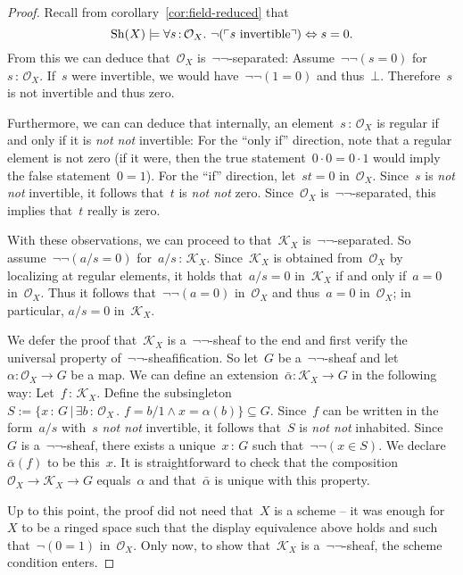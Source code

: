 \documentclass[10pt]{amsart}
\theoremstyle{definition}
\theoremstyle{plain}
\theoremstyle{remark}
\renewcommand{\O}{\mathcal{O}}
\newcommand{\K}{\mathcal{K}}
\newcommand{\Sh}{\mathrm{Sh}}
\newcommand{\?}{\,{:}\,}
\renewcommand{\_}{\mathpunct{.}\,}
\newcommand{\speak}[1]{\ulcorner\text{\textnormal{#1}}\urcorner}
\newcommand{\notnot}{\emph{not not}\xspace}
\begin{document}
\begin{proof}Recall from corollary~\ref{cor:field-reduced} that
\[ \Sh(X) \models \forall s\?\O_X\_ \neg(\speak{$s$ invertible}) \Leftrightarrow
s=0. \]
From this we can deduce that~$\O_X$ is~$\neg\neg$-separated:
Assume~$\neg\neg(s=0)$ for~$s\?\O_X$. If~$s$ were invertible, we would
have~$\neg\neg(1=0)$ and thus~$\bot$. Therefore~$s$ is not invertible and thus
zero.

Furthermore, we can can deduce that internally, an element~$s\?\O_X$ is regular
if and only if it is \notnot invertible: For the ``only if'' direction,
note that a regular element is not zero (if it were, then the true statement~$0
\cdot 0 = 0 \cdot 1$ would imply the false statement~$0 = 1$). For the ``if''
direction, let~$st = 0$ in~$\O_X$. Since~$s$ is \notnot invertible, it follows
that~$t$ is \notnot zero. Since~$\O_X$ is~$\neg\neg$-separated, this implies
that~$t$ really is zero.

With these observations, we can proceed to that~$\K_X$ is~$\neg\neg$-separated.
So assume~$\neg\neg(a/s = 0)$ for~$a/s \? \K_X$. Since~$\K_X$ is obtained
from~$\O_X$ by localizing at regular elements, it holds that~$a/s = 0$
in~$\K_X$ if and only if~$a = 0$ in~$\O_X$. Thus it follows that~$\neg\neg(a =
0)$ in~$\O_X$ and thus~$a = 0$ in~$\O_X$; in particular, $a/s = 0$ in~$\K_X$.

We defer the proof that~$\K_X$ is a~$\neg\neg$-sheaf to the end and first
verify the universal property of~$\neg\neg$-sheafification.
So let~$G$ be a~$\neg\neg$-sheaf and let~$\alpha : \O_X \to G$ be a map. We
can define an extension~$\bar\alpha : \K_X \to G$ in the following way:
Let~$f \? \K_X$. Define the subsingleton~$S := \{ x \? G \,|\, \exists
b\?\O_X\_ f = b/1 \wedge x = \alpha(b) \} \subseteq G$. Since~$f$ can be
written in the form~$a/s$ with~$s$ \notnot invertible, it follows that~$S$
is \notnot inhabited. Since~$G$ is a~$\neg\neg$-sheaf, there exists a
unique~$x\?G$ such that~$\neg\neg(x \in S)$. We declare~$\bar\alpha(f)$ to be
this~$x$. It is straightforward to check that the composition~$\O_X \to \K_X
\to G$ equals~$\alpha$ and that~$\bar\alpha$ is unique with this property.

Up to this point, the proof did not need that~$X$ is a scheme -- it was enough
for~$X$ to be a ringed space such that the display equivalence above holds and
such that~$\neg(0 = 1)$ in~$\O_X$. Only now, to show that~$\K_X$ is
a~$\neg\neg$-sheaf, the scheme condition enters.
\end{proof}
\end{document}
